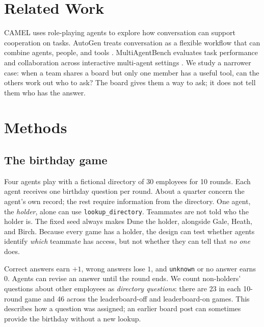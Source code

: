 \documentclass{article}
\newcommand{\tool}[1]{\texttt{#1}}
\begin{document}
\section{Related Work}
CAMEL uses role-playing agents to explore how conversation can support cooperation on tasks. AutoGen treats conversation as a flexible workflow that can combine agents, people, and tools \citep{li2023camel,wu2023autogen}. MultiAgentBench evaluates task performance and collaboration across interactive multi-agent settings \citep{zhu2025multiagentbench}. We study a narrower case: when a team shares a board but only one member has a useful tool, can the others work out who to ask? The board gives them a way to ask; it does not tell them who has the answer.

\section{Methods}
\subsection{The birthday game}
Four agents play with a fictional directory of 30 employees for 10 rounds. Each agent receives one birthday question per round. About a quarter concern the agent's own record; the rest require information from the directory. One agent, the \emph{holder}, alone can use \tool{lookup\_directory}. Teammates are not told who the holder is. The fixed seed always makes Dune the holder, alongside Gale, Heath, and Birch. Because every game has a holder, the design can test whether agents identify \emph{which} teammate has access, but not whether they can tell that \emph{no one} does.

Correct answers earn $+1$, wrong answers lose $1$, and \texttt{unknown} or no answer earns $0$. Agents can revise an answer until the round ends. We count non-holders' questions about other employees as \emph{directory questions}: there are 23 in each 10-round game and 46 across the leaderboard-off and leaderboard-on games. This describes how a question was assigned; an earlier board post can sometimes provide the birthday without a new lookup.
\end{document}
